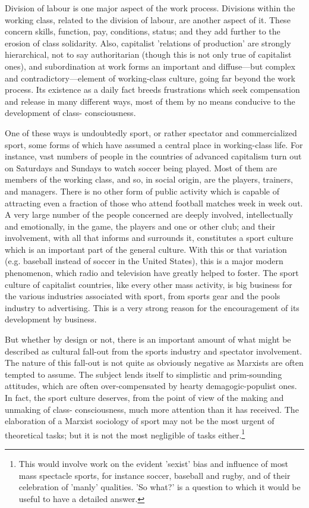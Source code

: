 Division of labour is one major aspect of the work process. Divisions within the working class, related to the division of labour, are another aspect of it. These concern skills, function, pay, conditions, status; and they add further to the erosion of class solidarity. Also, capitalist 'relations of production' are strongly hierarchical, not to say authoritarian (though this is not only true of capitalist ones), and subordination at work forms an important and diffuse—but complex and contradictory—element of working-class culture, going far beyond the work process. Its existence as a daily fact breeds frustrations which seek compensation and release in many different ways, most of them by no means conducive to the development of class- consciousness.

One of these ways is undoubtedly sport, or rather spectator and commercialized sport, some forms of which have assumed a central place in working-class life. For instance, vast numbers of people in the countries of advanced capitalism turn out on Saturdays and Sundays to watch soccer being played. Most of them are members of the working class, and so, in social origin, are the players, trainers, and managers. There is no other form of public activity which is capable of attracting even a fraction of those who attend football matches week in week out. A very large number of the people concerned are deeply involved, intellectually and emotionally, in the game, the players and one or other club; and their involvement, with all that informs and surrounds it, constitutes a sport culture which is an important part of the general culture. With this or that variation (e.g.
baseball instead of soccer in the United States), this is a major modern phenomenon, which radio and television have greatly helped to foster. The sport culture of capitalist countries, like every other mass activity, is big business for the various industries associated with sport, from sports gear and the pools industry to advertising. This is a very strong reason for the encouragement of its development by business.

But whether by design or not, there is an important amount of what might be described as cultural fall-out from the sports industry and spectator involvement. The nature of this fall-out is not quite as obviously negative as Marxists are often tempted to assume. The subject lends itself to simplistic and prim\hyp{}sounding attitudes, which are often over-compensated by hearty demagogic-populist ones. In fact, the sport culture deserves, from the point of view of the making and unmaking of class- consciousness, much more attention than it has received. The elaboration of a Marxist sociology of sport may not be the most urgent of theoretical tasks; but it is not the most negligible of tasks either.\footnote{This would involve work on the evident 'sexist' bias and influence of most mass spectacle sports, for instance soccer, baseball and rugby, and of their celebration of 'manly' qualities. 'So what?' is a question to which it would be useful to have a detailed answer.}

